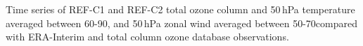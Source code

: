\label{fig:time_series}
Time series of REF-C1 and REF-C2 total ozone column and 50\,hPa temperature averaged between 60-90{\degree}, and 50\,hPa zonal wind averaged between 50-70\degrees compared with ERA-Interim and total column ozone database observations.